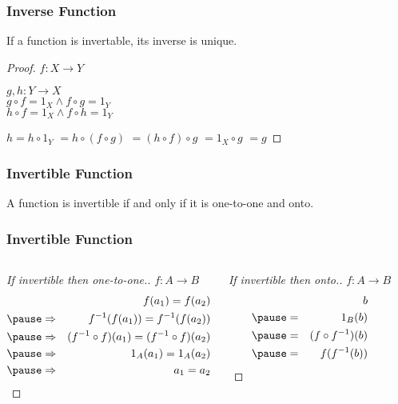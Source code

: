 \documentclass[dvipsnames]{beamer}
\begin{document}
\begin{frame}
  \frametitle{Inverse Function}

  \begin{theorem}
    If a function is invertable, its inverse is unique.
  \end{theorem}

  \pause
  \begin{proof}
    $f: X \rightarrow Y$

    \pause
    \medskip
    $g,h: Y \rightarrow X$\\
    $g \circ f = 1_X \wedge f \circ g = 1_Y$\\
    $h \circ f = 1_X \wedge f \circ h = 1_Y$

    \pause
    \medskip
    $h = h \circ 1_Y$
    \pause
    $ = h \circ (f \circ g)$
    \pause
    $ = (h \circ f) \circ g$
    \pause
    $ = 1_X \circ g$
    \pause
    $ = g$
  \end{proof}
\end{frame}

\begin{frame}
  \frametitle{Invertible Function}

  \begin{theorem}
    A function is invertible if and only if it is one-to-one and onto.
  \end{theorem}
\end{frame}

\begin{frame}
  \frametitle{Invertible Function}

  \begin{columns}[t]
    \begin{proof}[If invertible then one-to-one.]
      $f: A \rightarrow B$
      \begin{eqnarray*}
        &             & f(a_1) = f(a_2)\\\pause
        & \Rightarrow & f^{-1}(f(a_1)) = f^{-1}(f(a_2))\\\pause
        & \Rightarrow & (f^{-1} \circ f) (a_1) = (f^{-1} \circ f) (a_2)\\\pause
        & \Rightarrow & 1_A (a_1) = 1_A (a_2)\\\pause
        & \Rightarrow & a_1 = a_2
      \end{eqnarray*}
    \end{proof}

    \pause
    \begin{proof}[If invertible then onto.]
      $f: A \rightarrow B$
      \begin{eqnarray*}
        &   & b\\\pause
        & = & 1_B (b)\\\pause
        & = & (f \circ f^{-1}) (b)\\\pause
        & = & f(f^{-1} (b))
      \end{eqnarray*}
    \end{proof}
  \end{columns}
\end{frame}
\end{document}
